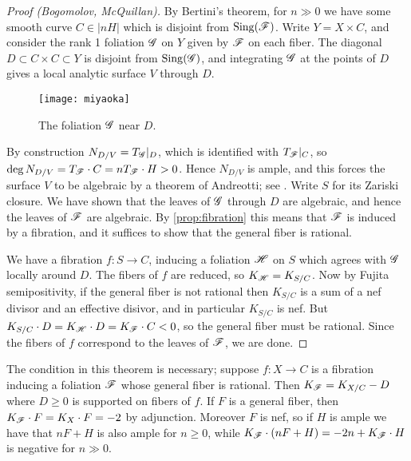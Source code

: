 \begin{proof}[Proof (Bogomolov, McQuillan)]
    By Bertini's theorem, for $n\gg0$ we have some smooth curve $C\in|nH|$ which
    is disjoint from $\operatorname{Sing}(\mathscr{F})$. Write $Y=X\times C$, and consider the rank
    1 foliation $\mathscr{G}$ on $Y$ given by $\mathscr{F}$ on each fiber. The diagonal
    $D\subset C\times C\subset Y$ is disjoint from $\operatorname{Sing}(\mathscr{G})$, and
    integrating $\mathscr{G}$ at the points of $D$ gives a local analytic surface $V$
    through $D$.
    \begin{figure}[H]
        \centering
        \texttt{[image: miyaoka]} %
        \caption{The foliation $\mathscr{G}$ near $D$.}
    \end{figure}
    By construction $N_{D/V}=T_{\mathscr{G}}|_D$, which is identified with $T_{\mathscr{F}}|_C$,
    so $\deg N_{D/V}=T_{\mathscr{F}}\cdot C=nT_{\mathscr{F}}\cdot H>0$. Hence $N_{D/V}$ is
    ample, and this forces the surface $V$ to be algebraic by a theorem of
    Andreotti; see \cite[Thm 3.4]{bost_13}. Write $S$ for its Zariski closure.
    We have shown that the leaves of $\mathscr{G}$ through $D$ are algebraic, and
    hence the leaves of $\mathscr{F}$ are algebraic. By \cref{prop:fibration} this
    means that $\mathscr{F}$ is induced by a fibration, and it suffices to show that
    the general fiber is rational.

    We have a fibration $f:S\to C$, inducing a foliation $\mathscr{H}$ on $S$ which
    agrees with $\mathscr{G}$ locally around $D$. The fibers of $f$ are reduced, so
    $K_{\mathscr{H}}=K_{S/C}$. Now by Fujita semipositivity, if the general fiber is not
    rational then $K_{S/C}$ is a sum of a nef divisor and an effective disivor,
    and in particular $K_{S/C}$ is nef. But
    $K_{S/C}\cdot D=K_{\mathscr{H}}\cdot D=K_{\mathscr{F}}\cdot C<0$, so the general fiber must
    be rational. Since the fibers of $f$ correspond to the leaves of $\mathscr{F}$, we
    are done.
\end{proof}

\begin{remark}
    The condition in this theorem is necessary; suppose $f:X\to C$ is a
    fibration inducing a foliation $\mathscr{F}$ whose general fiber is rational. Then
    $K_{\mathscr{F}}=K_{X/C}-D$ where $D\ge0$ is supported on fibers of $f$. If $F$ is a
    general fiber, then $K_{\mathscr{F}}\cdot F=K_X\cdot F=-2$ by adjunction. Moreover
    $F$ is nef, so if $H$ is ample we have that $nF+H$ is also ample for
    $n\ge0$, while $K_{\mathscr{F}}\cdot(nF+H)=-2n+K_{\mathscr{F}}\cdot H$ is negative for
    $n\gg0$.
\end{remark}
